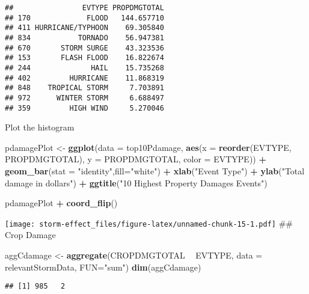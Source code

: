 \documentclass[
]{article}
\newenvironment{Shaded}{\begin{snugshade}}{\end{snugshade}}
\newcommand{\DataTypeTok}[1]{\textcolor[rgb]{0.13,0.29,0.53}{#1}}
\newcommand{\KeywordTok}[1]{\textcolor[rgb]{0.13,0.29,0.53}{\textbf{#1}}}
\newcommand{\NormalTok}[1]{#1}
\newcommand{\OperatorTok}[1]{\textcolor[rgb]{0.81,0.36,0.00}{\textbf{#1}}}
\newcommand{\StringTok}[1]{\textcolor[rgb]{0.31,0.60,0.02}{#1}}
\begin{document}
\begin{verbatim}
##                EVTYPE PROPDMGTOTAL
## 170             FLOOD   144.657710
## 411 HURRICANE/TYPHOON    69.305840
## 834           TORNADO    56.947381
## 670       STORM SURGE    43.323536
## 153       FLASH FLOOD    16.822674
## 244              HAIL    15.735268
## 402         HURRICANE    11.868319
## 848    TROPICAL STORM     7.703891
## 972      WINTER STORM     6.688497
## 359         HIGH WIND     5.270046
\end{verbatim}

Plot the histogram

\begin{Shaded}
\begin{Highlighting}[]
\NormalTok{pdamagePlot <-}\StringTok{ }\KeywordTok{ggplot}\NormalTok{(}\DataTypeTok{data =}\NormalTok{ top10Pdamage, }\KeywordTok{aes}\NormalTok{(}\DataTypeTok{x =} \KeywordTok{reorder}\NormalTok{(EVTYPE, PROPDMGTOTAL), }\DataTypeTok{y =}\NormalTok{ PROPDMGTOTAL, }\DataTypeTok{color =}\NormalTok{ EVTYPE)) }\OperatorTok{+}\StringTok{ }\KeywordTok{geom_bar}\NormalTok{(}\DataTypeTok{stat =} \StringTok{"identity"}\NormalTok{,}\DataTypeTok{fill=}\StringTok{"white"}\NormalTok{) }\OperatorTok{+}\StringTok{ }\KeywordTok{xlab}\NormalTok{(}\StringTok{"Event Type"}\NormalTok{) }\OperatorTok{+}\StringTok{  }\KeywordTok{ylab}\NormalTok{(}\StringTok{"Total damage in dollars"}\NormalTok{) }\OperatorTok{+}\StringTok{  }\KeywordTok{ggtitle}\NormalTok{(}\StringTok{"10 Highest Property Damages Events"}\NormalTok{) }

\NormalTok{pdamagePlot }\OperatorTok{+}\StringTok{ }\KeywordTok{coord_flip}\NormalTok{()}
\end{Highlighting}
\end{Shaded}

\texttt{[image: storm-effect\_files/figure-latex/unnamed-chunk-15-1.pdf]}
\#\# Crop Damage

\begin{Shaded}
\begin{Highlighting}[]
\NormalTok{aggCdamage <-}\StringTok{ }\KeywordTok{aggregate}\NormalTok{(CROPDMGTOTAL }\OperatorTok{~}\StringTok{ }\NormalTok{EVTYPE, }\DataTypeTok{data =}\NormalTok{ relevantStormData,  }\DataTypeTok{FUN=}\StringTok{"sum"}\NormalTok{)}
\KeywordTok{dim}\NormalTok{(aggCdamage) }
\end{Highlighting}
\end{Shaded}

\begin{verbatim}
## [1] 985   2
\end{verbatim}
\end{document}
